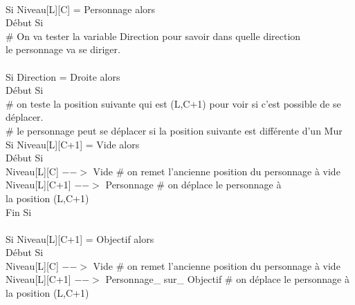 \documentclass{article}
\begin{document}
\begin{tabbing}
\\ \hspace{1cm} Si Niveau[L][C] = Personnage alors
\\ \hspace{1cm}  Début Si
\\ \hspace{2cm}	\# On va tester la variable Direction pour savoir dans quelle direction 
\\ \hspace{2cm} le personnage va se diriger.
\\
\\	\hspace{2cm} Si Direction = Droite alors
\\	\hspace{2cm} Début Si
\\	\hspace{3cm}	\# on teste la position suivante qui est (L,C+1) pour voir si c'est possible de se déplacer.
\\	\hspace{3cm}	\# le personnage peut se déplacer si la position suivante est différente d'un Mur			
\\	\hspace{3cm}	Si Niveau[L][C+1] = Vide alors			
\\	\hspace{3cm}	Début Si
\\	\hspace{4cm}		Niveau[L][C] $-->$ Vide 		\# on remet l'ancienne position du personnage à vide
\\	\hspace{4cm}		Niveau[L][C+1] $-->$ Personnage	\# on déplace le personnage à 
\\ \hspace{4cm} la position (L,C+1)
\\	\hspace{3cm}	Fin Si 
\\		
\\	\hspace{3cm}	Si Niveau[L][C+1] = Objectif alors			
\\	\hspace{3cm}	Début Si
\\	\hspace{4cm}		Niveau[L][C] $-->$ Vide \# on remet l'ancienne position du personnage à vide
\\	\hspace{4cm}		Niveau[L][C+1] $-->$ Personnage\_ sur\_ Objectif	\# on déplace le personnage à \\  \hspace{4cm} la position (L,C+1)

\end{tabbing}
\end{document}
